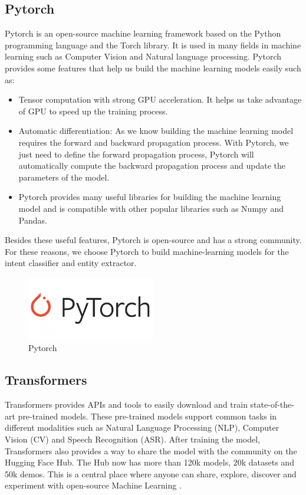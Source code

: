 \subsection{Pytorch}
Pytorch is an open-source machine learning framework based on the Python programming language and the Torch library. It is used in many fields in machine learning such as Computer Vision and Natural language processing.  Pytorch provides some features that help us build the machine learning models easily such as:
\begin{itemize}
    \item Tensor computation with strong GPU acceleration. It helps us take advantage of GPU to speed up the training process.
    \item Automatic differentiation: As we know building the machine learning model requires the forward and backward propagation process. With Pytorch, we just need to define the forward propagation process, Pytorch will automatically compute the backward propagation process and update the parameters of the model.
    \item Pytorch provides many useful libraries for building the machine learning model and is compatible with other popular libraries such as Numpy and Pandas.
\end{itemize}

\noindent Besides these useful features, Pytorch is open-source and has a strong community. For these reasons, we choose Pytorch to build machine-learning models for the intent classifier and entity extractor.

\begin{figure}[ht]
    \centering
    \includegraphics[width=0.5\textwidth]{Images/8.Technology_Stack/pytorch_logo.png}
    \caption{Pytorch}
    \label{fig:pytorch}
\end{figure}

\subsection{Transformers}
Transformers provides APIs and tools to easily download and train state-of-the-art pre-trained models. These pre-trained models support common tasks in different modalities such as Natural Language Processing (NLP), Computer Vision (CV) and Speech Recognition (ASR). After training the model, Transformers also provides a way to share the model with the community on the Hugging Face Hub. The Hub now has more than 120k models, 20k datasets and 50k demos. This is a central place where anyone can share, explore, discover and experiment with open-source Machine Learning \cite{huggingface}.

